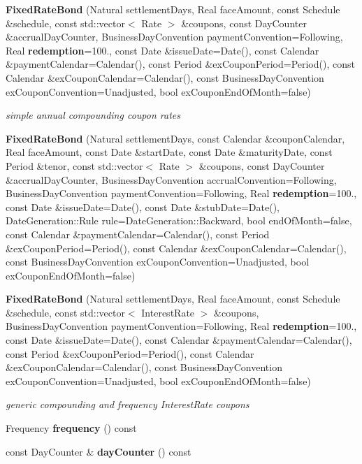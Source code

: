 \begin{DoxyCompactItemize}
\item 
{\bf Fixed\+Rate\+Bond} (Natural settlement\+Days, Real face\+Amount, const Schedule \&schedule, const std\+::vector$<$ Rate $>$ \&coupons, const Day\+Counter \&accrual\+Day\+Counter, Business\+Day\+Convention payment\+Convention=Following, Real {\bf redemption}=100., const Date \&issue\+Date=Date(), const Calendar \&payment\+Calendar=Calendar(), const Period \&ex\+Coupon\+Period=Period(), const Calendar \&ex\+Coupon\+Calendar=Calendar(), const Business\+Day\+Convention ex\+Coupon\+Convention=Unadjusted, bool ex\+Coupon\+End\+Of\+Month=false)\label{class_quant_lib_1_1_fixed_rate_bond_a919cc92257c49761a6e24ef218f33afe}

\begin{DoxyCompactList}\small\item\em simple annual compounding coupon rates \end{DoxyCompactList}\item 
{\bf Fixed\+Rate\+Bond} (Natural settlement\+Days, const Calendar \&coupon\+Calendar, Real face\+Amount, const Date \&start\+Date, const Date \&maturity\+Date, const Period \&tenor, const std\+::vector$<$ Rate $>$ \&coupons, const Day\+Counter \&accrual\+Day\+Counter, Business\+Day\+Convention accrual\+Convention=Following, Business\+Day\+Convention payment\+Convention=Following, Real {\bf redemption}=100., const Date \&issue\+Date=Date(), const Date \&stub\+Date=Date(), Date\+Generation\+::\+Rule rule=Date\+Generation\+::\+Backward, bool end\+Of\+Month=false, const Calendar \&payment\+Calendar=Calendar(), const Period \&ex\+Coupon\+Period=Period(), const Calendar \&ex\+Coupon\+Calendar=Calendar(), const Business\+Day\+Convention ex\+Coupon\+Convention=Unadjusted, bool ex\+Coupon\+End\+Of\+Month=false)
\item 
{\bf Fixed\+Rate\+Bond} (Natural settlement\+Days, Real face\+Amount, const Schedule \&schedule, const std\+::vector$<$ Interest\+Rate $>$ \&coupons, Business\+Day\+Convention payment\+Convention=Following, Real {\bf redemption}=100., const Date \&issue\+Date=Date(), const Calendar \&payment\+Calendar=Calendar(), const Period \&ex\+Coupon\+Period=Period(), const Calendar \&ex\+Coupon\+Calendar=Calendar(), const Business\+Day\+Convention ex\+Coupon\+Convention=Unadjusted, bool ex\+Coupon\+End\+Of\+Month=false)\label{class_quant_lib_1_1_fixed_rate_bond_adb154998f899ea795cf608efa7aa2125}

\begin{DoxyCompactList}\small\item\em generic compounding and frequency Interest\+Rate coupons \end{DoxyCompactList}\item 
Frequency {\bfseries frequency} () const \label{class_quant_lib_1_1_fixed_rate_bond_a7121c22d5244456f363f14677c99348b}

\item 
const Day\+Counter \& {\bfseries day\+Counter} () const \label{class_quant_lib_1_1_fixed_rate_bond_ad57c43c6cb561aefe15aa3d641e7a4f0}

\end{DoxyCompactItemize}
